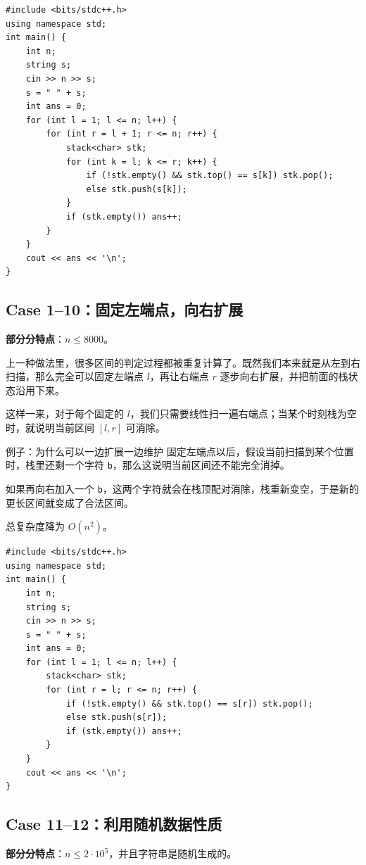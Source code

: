 \documentclass{book}
\begin{document}
\newpage
    \begin{lstlisting}[style = code]
#include <bits/stdc++.h>
using namespace std;
int main() {
    int n;
    string s;
    cin >> n >> s;
    s = " " + s;
    int ans = 0;
    for (int l = 1; l <= n; l++) {
        for (int r = l + 1; r <= n; r++) {
            stack<char> stk;
            for (int k = l; k <= r; k++) {
                if (!stk.empty() && stk.top() == s[k]) stk.pop();
                else stk.push(s[k]);
            }
            if (stk.empty()) ans++;
        }
    }
    cout << ans << '\n';
}\end{lstlisting}

    \subsection{Case 1--10：固定左端点，向右扩展}
    \textbf{部分分特点}：$n \le 8000$。

    上一种做法里，很多区间的判定过程都被重复计算了。既然我们本来就是从左到右扫描，那么完全可以固定左端点 $l$，再让右端点 $r$ 逐步向右扩展，并把前面的栈状态沿用下来。

    这样一来，对于每个固定的 $l$，我们只需要线性扫一遍右端点；当某个时刻栈为空时，就说明当前区间 $[l,r]$ 可消除。

    \begin{examplebox}{例子：为什么可以一边扩展一边维护}
        固定左端点以后，假设当前扫描到某个位置时，栈里还剩一个字符 \texttt{b}，那么这说明当前区间还不能完全消掉。

        如果再向右加入一个 \texttt{b}，这两个字符就会在栈顶配对消除，栈重新变空，于是新的更长区间就变成了合法区间。
    \end{examplebox}

    总复杂度降为 $O(n^2)$。

\newpage
    \begin{lstlisting}[style = code]
#include <bits/stdc++.h>
using namespace std;
int main() {
    int n;
    string s;
    cin >> n >> s;
    s = " " + s;
    int ans = 0;
    for (int l = 1; l <= n; l++) {
        stack<char> stk;
        for (int r = l; r <= n; r++) {
            if (!stk.empty() && stk.top() == s[r]) stk.pop();
            else stk.push(s[r]);
            if (stk.empty()) ans++;
        }
    }
    cout << ans << '\n';
}
    \end{lstlisting}

    \subsection{Case 11--12：利用随机数据性质}
    \textbf{部分分特点}：$n \le 2 \cdot 10^5$，并且字符串是随机生成的。
\end{document}
